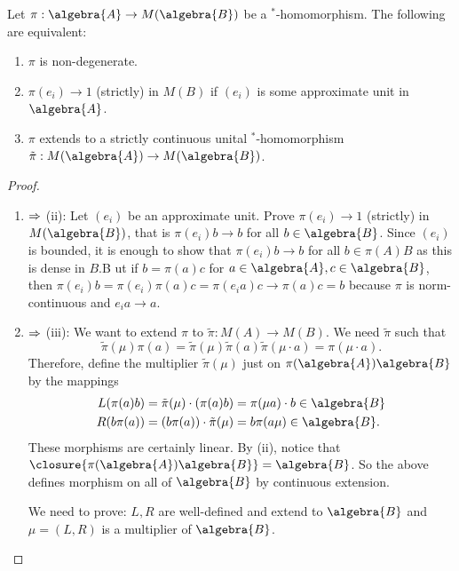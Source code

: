 \documentclass[a4paper]{article}
\begin{document}
\begin{lemma}
	Let $\pi: \algebra{A} \to M(\algebra{B})$ be a $^*$-homomorphism. The following are equivalent:
	\begin{enumerate}
		\item $\pi$ is non-degenerate.
		\item $\pi(e_i) \to 1$ (strictly) in $M(B)$ if $(e_i)$ is some approximate unit in $\algebra{A}$.
		\item $\pi$ extends to a strictly continuous unital $^*$-homomorphism $\tilde{\pi}: M(\algebra{A}) \to M(\algebra{B})$.
	\end{enumerate}
\end{lemma}

\begin{proof}~
	\begin{enumerate}
		\item $\Rightarrow$ (ii): Let $(e_i)$ be an approximate unit. 
		Prove $\pi(e_i) \to 1$ (strictly) in $M(\algebra{B})$, that is $\pi(e_i) b \to b$ for all $b \in \algebra{B}$.
		Since $(e_i)$ is bounded, it is enough to show that $\pi(e_i) b \to b$ for all $b \in \pi(A) B$ as this is dense in $B$.B
		ut if $b = \pi(a) c$ for $a \in \algebra{A}, c \in \algebra{B}$, then $\pi(e_i) b = \pi(e_i) \pi(a) c = \pi(e_i a) c \to \pi(a) c = b$ because $\pi$ is norm-continuous and $e_i a \to a$.  
		\item $\Rightarrow$ (iii): We want to extend $\pi$ to $\tilde{\pi}: M(A) \to M(B)$.
		We need $\tilde{\pi}$ such that 
		\begin{equation*}
			\tilde{\pi}(\mu) \pi(a) = \tilde{\pi}(\mu) \tilde{\pi}(a)  \tilde{\pi}(\mu \cdot a) = \pi(\mu \cdot a)\text{.}
		\end{equation*}
		Therefore, define the multiplier $\tilde{\pi}(\mu)$ just on $\pi(\algebra{A}) \algebra{B}$ by the mappings
		\begin{align*}
			L(\pi(a) b) = \tilde{\pi}(\mu) \cdot (\pi(a) b) &= \pi(\mu a) \cdot b \in \algebra{B}\\
			R(b \pi(a)) = (b \pi(a)) \cdot \tilde{\pi}(\mu) &= b \pi(a \mu) \in \algebra{B} \text{.}
		\end{align*}
		These morphisms are certainly linear.
		By (ii), notice that $\closure{\pi(\algebra{A}) \algebra{B}} = \algebra{B}$.
		So the above defines morphism on all of $\algebra{B}$ by continuous extension.

		We need to prove: $L,R$ are well-defined and extend to $\algebra{B}$ and $\mu = (L,R)$ is a multiplier of $\algebra{B}$.


\end{enumerate}
\end{proof}
\end{document}
